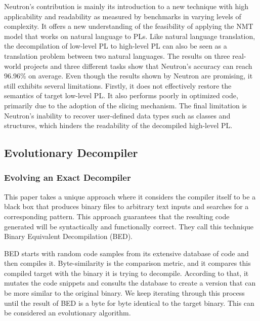 \documentclass[conference,a4paper]{IEEEtran}
\begin{document}
Neutron’s contribution is mainly its introduction to a new technique with high applicability and readability as measured by benchmarks in varying levels of complexity. It offers a new understanding of the feasibility of applying the NMT model that works on natural language to PLs.
Like natural language translation, the decompilation of low-level PL to high-level PL can also be seen as a translation problem between two natural languages.
The results on three real-world projects and three different tasks show that Neutron’s accuracy can reach 96.96\% on average.
Even though the results shown by Neutron are promising, it still exhibits several limitations. Firstly, it does not effectively restore the semantics of target low-level PL. It also performs poorly in optimized code, primarily due to the adoption of the slicing mechanism.
The final limitation is Neutron’s inability to recover user-defined data types such as classes and structures, which hinders the readability of the decompiled high-level PL.
 \cite{liang_neutron_2021}

\subsection{Evolutionary Decompiler}

\subsubsection{Evolving an Exact Decompiler}

This paper \cite{schulte_evolving_2018} takes a unique approach where it considers the compiler itself to be a black box that produces binary files to arbitrary text inputs and searches for a corresponding pattern.
This approach guarantees that the resulting code generated will be syntactically and functionally correct.
They call this technique Binary Equivalent Decompilation (BED).

BED starts with random code samples from its extensive database of code and then compiles it.
Byte-similarity is the comparison metric, and it compares this compiled target with the binary it is trying to decompile.
According to that, it mutates the code snippets and consults the database to create a version that can be more similar to the original binary.
We keep iterating through this process until the result of BED is a byte for byte identical to the target binary.
This can be considered an evolutionary algorithm.
\end{document}
